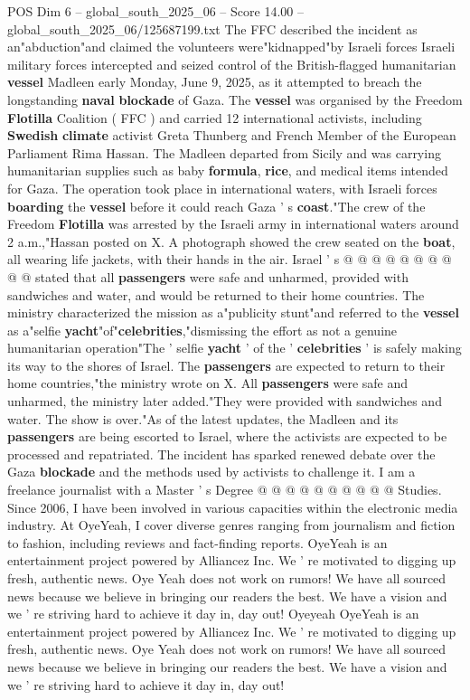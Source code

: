 \begin{textsample}{POS Dim 6 – global\_south\_2025\_06 – Score 14.00 – global\_south\_2025\_06/125687199.txt}  \label{ex:f6_pos_014}
The FFC described the incident as an"abduction"and claimed the volunteers were"kidnapped"by Israeli forces Israeli military forces intercepted and seized control of the British-flagged humanitarian \textbf{vessel} Madleen early Monday, June 9, 2025, as it attempted to breach the longstanding \textbf{naval} \textbf{blockade} of Gaza.
The \textbf{vessel} was organised by the Freedom \textbf{Flotilla} Coalition ( FFC ) and carried 12 international activists, including \textbf{Swedish} \textbf{climate} activist Greta Thunberg and French Member of the European Parliament Rima Hassan.
The Madleen departed from Sicily and was carrying humanitarian supplies such as baby \textbf{formula}, \textbf{rice}, and medical items intended for Gaza.
The operation took place in international waters, with Israeli forces \textbf{boarding} the \textbf{vessel} before it could reach Gaza ' s \textbf{coast}."The crew of the Freedom \textbf{Flotilla} was arrested by the Israeli army in international waters around 2 a.m.,"Hassan posted on X.
A photograph showed the crew seated on the \textbf{boat}, all wearing life jackets, with their hands in the air.
Israel ' s @ @ @ @ @ @ @ @ @ @ stated that all \textbf{passengers} were safe and unharmed, provided with sandwiches and water, and would be returned to their home countries.
The ministry characterized the mission as a"publicity stunt"and referred to the \textbf{vessel} as a"selfie \textbf{yacht}"of"\textbf{celebrities},"dismissing the effort as not a genuine humanitarian operation"The ' selfie \textbf{yacht} ' of the ' \textbf{celebrities} ' is safely making its way to the shores of Israel.
The \textbf{passengers} are expected to return to their home countries,"the ministry wrote on X.
All \textbf{passengers} were safe and unharmed, the ministry later added."They were provided with sandwiches and water.
The show is over."As of the latest updates, the Madleen and its \textbf{passengers} are being escorted to Israel, where the activists are expected to be processed and repatriated.
The incident has sparked renewed debate over the Gaza \textbf{blockade} and the methods used by activists to challenge it.
I am a freelance journalist with a Master ' s Degree @ @ @ @ @ @ @ @ @ @ Studies.
Since 2006, I have been involved in various capacities within the electronic media industry.
At OyeYeah, I cover diverse genres ranging from journalism and fiction to fashion, including reviews and fact-finding reports.
OyeYeah is an entertainment project powered by Alliancez Inc.
We ' re motivated to digging up fresh, authentic news.
Oye Yeah does not work on rumors!
We have all sourced news because we believe in bringing our readers the best.
We have a vision and we ' re striving hard to achieve it day in, day out!
Oyeyeah OyeYeah is an entertainment project powered by Alliancez Inc.
We ' re motivated to digging up fresh, authentic news.
Oye Yeah does not work on rumors!
We have all sourced news because we believe in bringing our readers the best.
We have a vision and we ' re striving hard to achieve it day in, day out!

\end{textsample}
